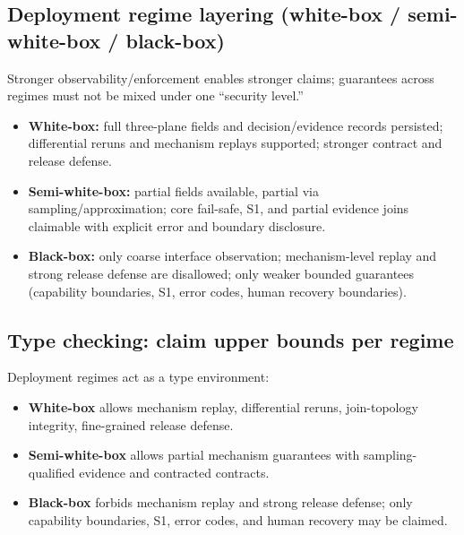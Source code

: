\documentclass[11pt,a4paper]{report}
\begin{document}
\subsection{Deployment regime layering (white-box / semi-white-box / black-box)}
Stronger observability/enforcement enables stronger claims; guarantees across regimes must not be mixed under one “security level.”
\begin{itemize}
  \item \textbf{White-box:} full three-plane fields and decision/evidence records persisted; differential reruns and mechanism replays supported; stronger contract and release defense.
  \item \textbf{Semi-white-box:} partial fields available, partial via sampling/approximation; core fail-safe, S1, and partial evidence joins claimable with explicit error and boundary disclosure.
  \item \textbf{Black-box:} only coarse interface observation; mechanism-level replay and strong release defense are disallowed; only weaker bounded guarantees (capability boundaries, S1, error codes, human recovery boundaries).
\end{itemize}

\subsection{Type checking: claim upper bounds per regime}
Deployment regimes act as a type environment:
\begin{itemize}
  \item \textbf{White-box} allows mechanism replay, differential reruns, join-topology integrity, fine-grained release defense.
  \item \textbf{Semi-white-box} allows partial mechanism guarantees with sampling-qualified evidence and contracted contracts.
  \item \textbf{Black-box} forbids mechanism replay and strong release defense; only capability boundaries, S1, error codes, and human recovery may be claimed.
\end{itemize}
\end{document}
